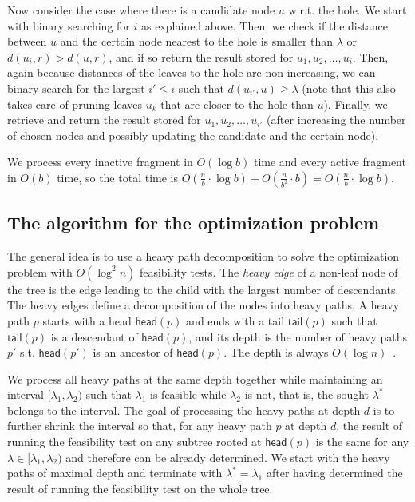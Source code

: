 \documentclass[a4paper,UKenglish]{lipics-v2016}
\theoremstyle{plain}
\newcommand{\head}{\textsf{head}}
\newcommand{\tail}{\textsf{tail}}
\begin{document}
Now consider the case where there is a candidate node $u$ w.r.t. the hole. We start with binary searching for $i$ as explained above. Then,
we check if the distance between $u$ and the certain node nearest to the hole is smaller than $\lambda$ or
$d(u_{i},r)>d(u,r)$, and if so return the result stored for $u_{1},u_{2},\ldots,u_{i}$. Then, again because distances of the leaves
to the hole are non-increasing, we can binary search for the largest $i'\leq i$ such that $d(u_{i'},u)\geq \lambda$
(note that this also takes care of pruning leaves $u_{k}$ that are closer to the hole than $u$).
Finally, we retrieve and return the result stored for $u_{1},u_{2},\ldots,u_{i'}$ (after increasing the number of chosen nodes
and possibly updating the candidate and the certain node).

We process every inactive fragment in $O(\log b)$ time and every active fragment in $O(b)$ time, so the total time is
$O(\frac{n}{b} \cdot \log b) + O(\frac{n}{b^2} \cdot b) = O(\frac{n}{b}\cdot \log b)$.

\subsection{The algorithm for the optimization problem} \label{sec:nloglogn}

The general idea is to use a heavy path decomposition to solve the optimization  problem
with $O(\log^{2}n)$ feasibility tests. The {\em heavy edge} of a non-leaf node of the tree is the edge leading to the child
with the largest number of descendants. The heavy edges define a decomposition of the nodes into heavy paths. A heavy
path $p$ starts with a head $\head(p)$ and ends with a tail $\tail(p)$ such that $\tail(p)$ is a descendant of $\head(p)$,
and its depth is the number of heavy paths $p'$ s.t. $\head(p')$ is an ancestor of $\head(p)$. The depth 
is always $O(\log n)$~\cite{Sleator1983}.

We process all heavy paths at the same depth together while maintaining an interval $[\lambda_{1},\lambda_{2})$ such that
$\lambda_{1}$ is feasible while $\lambda_{2}$ is not, that is, the sought $\lambda^{*}$ belongs to the interval.
The goal of processing the heavy paths at depth $d$ is to further shrink the interval so that, for any heavy path $p$ at depth $d$,
the result of running the feasibility
test on any subtree rooted at $\head(p)$ is the same for any $\lambda\in[\lambda_{1},\lambda_{2})$ and therefore can
be already determined. We start with the heavy paths of maximal depth and terminate
with $\lambda^{*}=\lambda_{1}$ after having determined the result of running the feasibility test on the whole tree.
\end{document}
